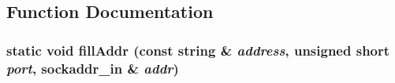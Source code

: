 \subsection{Function Documentation}
\subsubsection{\setlength{\rightskip}{0pt plus 5cm}static void fill\-Addr (const string \& {\em address}, unsigned short {\em port}, sockaddr\_\-in \& {\em addr})\hspace{0.3cm}{\tt  [static]}}\label{PracticalSocket_8cpp_155e03535e1d5c1f5df7ceafe63dbdb0}


